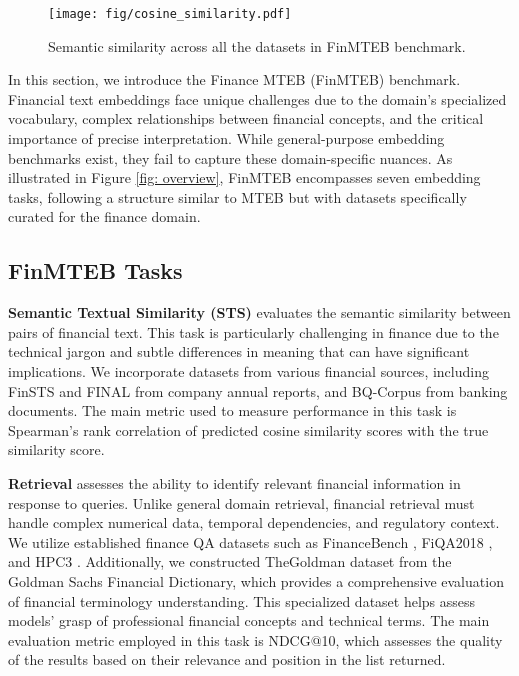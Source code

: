 \begin{center}
    \begin{figure*}[ht]
    \centering
    \texttt{[image: fig/cosine\_similarity.pdf]}
    \caption{Semantic similarity across all the datasets in FinMTEB benchmark.}
    \label{fig: semantic_diveristy}
    \label{append: semantic_diveristy}
    \end{figure*} 
\end{center}



In this section, we introduce the Finance MTEB (FinMTEB) benchmark. Financial text embeddings face unique challenges due to the domain's specialized vocabulary, complex relationships between financial concepts, and the critical importance of precise interpretation. While general-purpose embedding benchmarks exist, they fail to capture these domain-specific nuances. As illustrated in Figure \ref{fig: overview}, FinMTEB encompasses seven embedding tasks, following a structure similar to MTEB \citep{mteb} but with datasets specifically curated for the finance domain.


\subsection{FinMTEB Tasks}

\textbf{Semantic Textual Similarity (STS)} evaluates the semantic similarity between pairs of financial text. This task is particularly challenging in finance due to the technical jargon and subtle differences in meaning that can have significant implications. We incorporate datasets from various financial sources, including FinSTS \citep{finsts} and FINAL \citep{final} from company annual reports, and BQ-Corpus \citep{bq-corpus} from banking documents. The main metric used to measure performance in this task is Spearman's rank correlation of predicted cosine similarity scores with the true similarity score.

\textbf{Retrieval} assesses the ability to identify relevant financial information in response to queries. Unlike general domain retrieval, financial retrieval must handle complex numerical data, temporal dependencies, and regulatory context. We utilize established finance QA datasets such as FinanceBench \citep{financebench}, FiQA2018 \citep{FiQA}, and HPC3 \citep{hpc3}. Additionally, we constructed TheGoldman dataset from the Goldman Sachs Financial Dictionary, which provides a comprehensive evaluation of financial terminology understanding. This specialized dataset helps assess models' grasp of professional financial concepts and technical terms. The main evaluation metric employed in this task is NDCG@10, which assesses the quality of the results based on their relevance and position in the list returned. 


